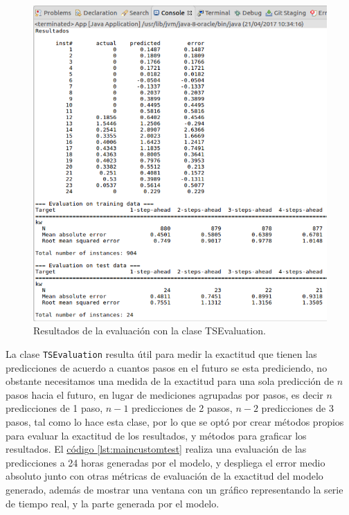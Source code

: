 \begin{figure}[!h]
	\centering
	\includegraphics[width=15cm]{img/resultadosEvaluacion.png}
	\caption{Resultados de la evaluación con la clase TSEvaluation. }
	\label{fig:resultadosEvaluacion}
\end{figure}
La clase \texttt{TSEvaluation} resulta útil para medir la exactitud que tienen las predicciones de acuerdo a cuantos pasos en el futuro se esta prediciendo, no obstante necesitamos una medida de la exactitud para una sola predicción de $n$ pasos hacia el futuro, en lugar de mediciones agrupadas por pasos, es decir $n$ predicciones de 1 paso, $n-1$ predicciones de 2 pasos, $n-2$ predicciones de 3 pasos, tal como lo hace esta clase, por lo que se optó por crear métodos propios para evaluar la exactitud de los resultados, y métodos para graficar los resultados.
El \hyperref[lst:maincustomtest]{código \ref{lst:maincustomtest}} realiza una evaluación de las predicciones a 24 horas generadas por el modelo, y despliega el error medio absoluto junto con otras métricas de evaluación de la exactitud del modelo generado, además de mostrar una ventana con un gráfico representando la serie de tiempo real, y la parte generada por el modelo.


